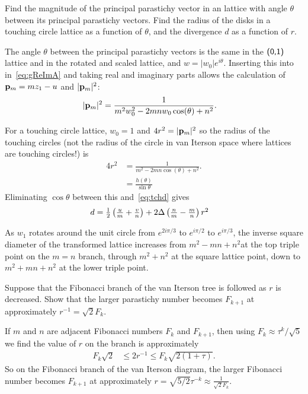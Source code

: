 \begin{jExercise}
\label{ex:calcprinciplay}
	Find the magnitude of the principal parastichy vector in an   lattice with angle $\theta$ between its principal parastichy vectors.
	Find the radius of the disks in a touching circle lattice as a function of $\theta$, and the divergence $d$ as a function of $r$.
\end{jExercise}
\begin{jAnswer}
The angle  $\theta$ between the principal parastichy vectors is the same in the $\textsf{(0,1)}$ lattice and in the rotated and scaled lattice, and  $w=|w_0|e^{i\theta}$.  Inserting this into in~\eqref{eq:gReImA} and taking real and imaginary parts allows the calculation of ${\mathbf p}_{m}=m z_1 -u$ and $|{\mathbf p}_{m}|^2$: 
	\begin{align}
	|{\mathbf p}_{m}|^2 &=\frac{1}{m^2 w_0^2-2 m n w_0 \cos (\theta )+n^2}.
		\end{align}
	
		
For a touching circle lattice, $w_0=1$ and $4r^2=	|{\mathbf p}_{m}|^2$ so the radius of the touching circles (not the radius of the circle in van Iterson space where lattices are touching circles!) is
\begin{align}
4 r^{2}  &=\frac{1}{ m^2-2 m n \cos (\theta )+n^2}.
\\
&= \frac{h(\theta)}{\sin \theta}
\end{align}
Eliminating $\cos\theta$ between this and~\eqref{eq:tchd} gives
\begin{align}
d&=		\textstyle{\frac{1}{2}}
\left(\frac{u}{m}+\frac{v}{n}\right)
+ 2\Delta  \left(\frac{n}{m}-\frac{m}{n}\right)r^2
\end{align}

As $w_1$ rotates around the unit circle from $e^{2i\pi/3}$ to $e^{i\pi/2}$ to $e^{i\pi/3}$, the inverse square diameter of the transformed lattice increases from $m^2-mn+n^2$at the top triple point on the $m=n$ branch, through  $m^2+n^2$ at the square lattice point, down to $m^2+mn+n^2$  at the lower triple point.
\end{jAnswer}

\begin{jExercise}
	\label{ex:fibthresholds}
Suppose that the Fibonacci branch of the van Iterson tree is followed as $r$ is decreased.
Show that the larger parastichy number becomes $F_{k+1}$ at approximately  $r^{-1}={\sqrt{2}F_k}$.
\end{jExercise}
\begin{jAnswer}

If $m$ and $n$ are adjacent Fibonacci numbers $F_{k}$ and $F_{k+1}$, then using $F_k\approx \tau^k/\sqrt{5}
$ we find the value of $r$ on the branch is approximately
	\begin{align}
  F_k \sqrt{2} &\leq	2 r^{-1}  \leq F_k \sqrt{2(1+\tau)}.
\end{align}
So on the Fibonacci branch of the van Iterson diagram, 
the larger Fibonacci number becomes $F_{k+1}$ at approximately $r=\sqrt{5/2}\tau^{-k}\approx \frac{1}{\sqrt{2}F_k}$.
\end{jAnswer}





